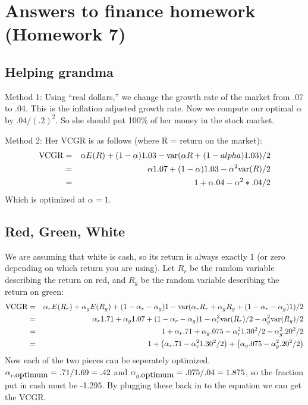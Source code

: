 \documentclass{article}
\begin{document}
\section*{Answers to finance homework (Homework 7)}

\subsection*{Helping grandma}

Method 1: Using ``real dollars,'' we change the growth rate of the
market from .07 to .04.  This is the inflation adjusted growth rate.
Now we compute our optimal $\alpha$ by $.04/(.2)^2$.  So she should
put 100\% of her money in the stock market.

Method 2:  Her VCGR is as follows (where R = return on the market):
\begin{eqnarray*}
\hbox{VCGR} & = & \alpha E(R) + (1-\alpha) 1.03 -
\hbox{var}(\alpha R + (1-alpha)1.03)/2 \\
& = & \alpha 1.07 + (1-\alpha) 1.03 - \alpha^2 \hbox{var}(R)/2 \\
& = & 1 + \alpha .04 - \alpha^2 * .04/2 
\end{eqnarray*}
Which is optimized at $\alpha = 1$.

\subsection*{Red, Green, White}

We are assuming that white is cash, so its return is always exactly 1
(or zero depending on which return you are using).  Let $R_r$ be the
random variable describing the return on red, and $R_g$ be the random
variable describing the return on green:
\begin{eqnarray*}
\hbox{VCGR} & = & \alpha_r E(R_r) + \alpha_g E(R_g) + (1-\alpha_r
- \alpha_g) 1 - \hbox{var}(\alpha_r R_r + \alpha_g R_g + (1-\alpha_r - \alpha_g)1)/2 \\
& = & \alpha_r 1.71 + \alpha_g 1.07 + (1-\alpha_r
- \alpha_g) 1 - \alpha_r^2 \hbox{var}(R_r)/2 - \alpha_g^2 \hbox{var}(R_g)/2 \\
& = & 1 + \alpha_r .71 + \alpha_g .075 - \alpha_r^2 1.30^2/2 - \alpha_g^2 .20^2/2 \\
& = & 1 + \left(\alpha_r .71 - \alpha_r^2 1.30^2/2\right) + \left(\alpha_g .075 - \alpha_g^2 .20^2/2 \right)
\end{eqnarray*}
Now each of the two pieces can be seperately optimized.
$\alpha_{r,\hbox{optimum}} = .71/1.69 = .42$ and
$\alpha_{g,\hbox{optimum}} = .075/.04 = 1.875$, so the fraction put in
cash must be -1.295.  By plugging these back in to the equation we can
get the VCGR.
\end{document}

